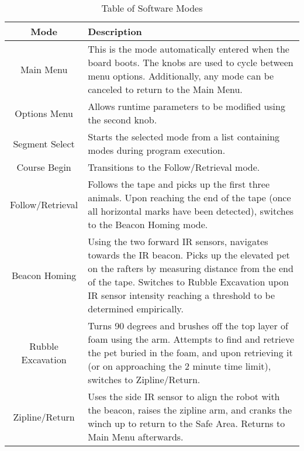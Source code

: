 \begin{table}[h]
	\caption{Table of Software Modes}
	\centering
	\begin{tabular}{ | c | p{5in} | }
		\hline
		\textbf{Mode} & \textbf{Description} \\ \hline
		Main Menu & This is the mode automatically entered when the board boots. The knobs are used to cycle between menu options. Additionally, any mode can be canceled to return to the Main Menu. \\ \hline
		Options Menu & Allows runtime parameters to be modified using the second knob. \\ \hline
		Segment Select & Starts the selected mode from a list containing modes during program execution. \\ \hline
		Course Begin & Transitions to the Follow/Retrieval mode. \\ \hline
		Follow/Retrieval & Follows the tape and picks up the first three animals. Upon reaching the end of the tape (once all horizontal marks have been detected), switches to the Beacon Homing mode. \\ \hline
		Beacon Homing & Using the two forward IR sensors, navigates towards the IR beacon. Picks up the elevated pet on the rafters by measuring distance from the end of the tape. Switches to Rubble Excavation upon IR sensor intensity reaching a threshold to be determined empirically. \\ \hline
		Rubble Excavation & Turns 90 degrees and brushes off the top layer of foam using the arm. Attempts to find and retrieve the pet buried in the foam, and upon retrieving it (or on approaching the 2 minute time limit), switches to Zipline/Return. \\ \hline
		Zipline/Return &
		Uses the side IR sensor to align the robot with the beacon, raises the zipline arm, and cranks the winch up to return to the Safe Area. Returns to Main Menu afterwards.
		\\ \hline
	\end{tabular}
	\label{table:Software Modes}
\end{table}
